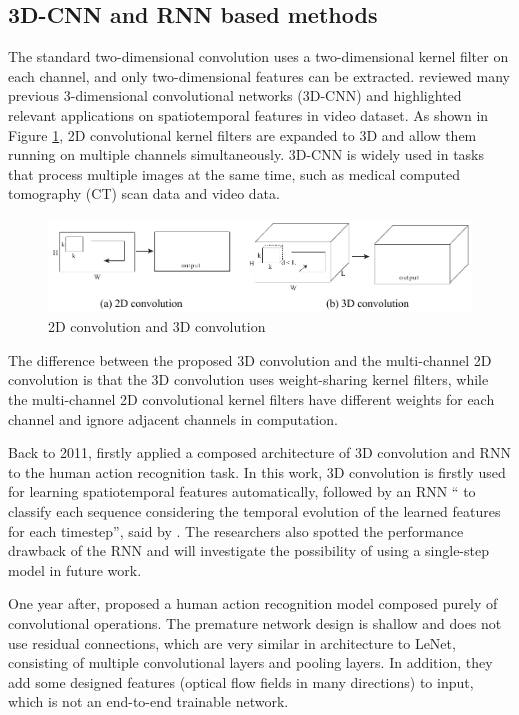 \subsection{3D-CNN and RNN based methods}
\label{subsec: 3D-CNN and RNN based methods}
The standard two-dimensional convolution uses a two-dimensional kernel filter on each channel, and only two-dimensional features can be extracted.
\citet{tran2015learning} reviewed many previous 3-dimensional convolutional networks (3D-CNN) and highlighted relevant applications on spatiotemporal features in video dataset.
As shown in Figure \ref{fig:2-2dcnn-3dcnn}, 2D convolutional kernel filters are expanded to 3D and allow them running on multiple channels simultaneously.
3D-CNN is widely used in tasks that process multiple images at the same time, such as medical computed tomography (CT) scan data and video data.

\begin{figure}[!ht]
    \centering
    \includegraphics[width=\textwidth]{literature/imgs/2-2dcnn-3dcnn.pdf}
    \caption{2D convolution and 3D convolution \cite{tran2015learning}}
    \label{fig:2-2dcnn-3dcnn}
\end{figure}

The difference between the proposed 3D convolution and the multi-channel 2D convolution is that the 3D convolution uses weight-sharing kernel filters, while the multi-channel 2D convolutional kernel filters have different weights for each channel and ignore adjacent channels in computation.

Back to 2011, \citet{baccouche2011sequential} firstly applied a composed architecture of 3D convolution and RNN to the human action recognition task.
In this work, 3D convolution is firstly used for learning spatiotemporal features automatically, followed by an RNN `` to classify each sequence considering the temporal evolution of the learned features for each timestep'', said by \citet{baccouche2011sequential}.
The researchers also spotted the performance drawback of the RNN and will investigate the possibility of using a single-step model in future work.

One year after, \citet{ji20123d} proposed a human action recognition model composed purely of convolutional operations. %
The premature network design is shallow and does not use residual connections, which are very similar in architecture to LeNet, consisting of multiple convolutional layers and pooling layers. In addition, they add some designed features (optical flow fields in many directions) to input, which is not an end-to-end trainable network.

